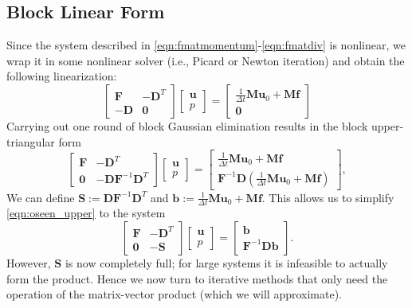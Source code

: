 \documentclass{article}
\newcommand{\mat}[1]{\bm{{#1}}}
\renewcommand{\vec}[1]{\bm{{#1}}}
\begin{document}
\subsection{Block Linear Form}
Since the system described in \eqref{eqn:fmatmomentum}-\eqref{eqn:fmatdiv} is nonlinear, we wrap it in some nonlinear solver (i.e., Picard or Newton iteration) and obtain the following linearization:
\begin{equation}
  \begin{bmatrix}
    \mat{F} & -\mat{D}^T \\
    -\mat{D} & \mat{0}
  \end{bmatrix}
  \begin{bmatrix}
    \vec{u} \\ p
  \end{bmatrix}
  =
  \begin{bmatrix}
    \frac{1}{\Delta t}\mat{M}\vec{u}_0 + \mat{M}\vec{f} \\ \mat{0}
  \end{bmatrix}
\end{equation}
Carrying out one round of block Gaussian elimination results in the block upper-triangular form
\begin{equation}
  \begin{bmatrix}
    \mat{F} & -\mat{D}^T \\
    \mat{0} & -\mat{D}\mat{F}^{-1}\mat{D}^T
  \end{bmatrix}
  \begin{bmatrix}
    \vec{u} \\ p
  \end{bmatrix}
  =
  \begin{bmatrix}
    \frac{1}{\Delta t}\mat{M}\vec{u}_0 + \mat{M}\vec{f} \\ \mat{F}^{-1}\mat{D}\left( \frac{1}{\Delta t}\mat{M}\vec{u}_0 + \mat{M}\vec{f}\right)
  \end{bmatrix}, \label{eqn:oseen_upper}
\end{equation}
We can define $\mat{S}:=\mat{D}\mat{F}^{-1}\mat{D}^T$ and $\vec{b}:=\frac{1}{\Delta t}\mat{M}\vec{u}_0 + \mat{M}\vec{f}$.  This allows us to simplify \eqref{eqn:oseen_upper} to the system
\begin{equation}
  \begin{bmatrix}
    \mat{F} & -\mat{D}^T \\
    \mat{0} & -\mat{S}
  \end{bmatrix}
  \begin{bmatrix}
    \vec{u} \\ p
  \end{bmatrix}
  =
  \begin{bmatrix}
    \vec{b} \\ \mat{F}^{-1}\mat{D}\vec{b}
  \end{bmatrix}. \label{eqn:oseen_schur}
\end{equation}
However, $\mat{S}$ is now completely full; for large systems it is infeasible to actually form the product.  Hence we now turn to iterative methods that only need the operation of the matrix-vector product (which we will approximate).
\end{document}
